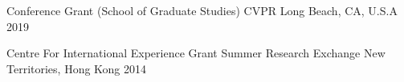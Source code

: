 



\begin{cvhonors}

  \cvhonor
    {Conference Grant (School of Graduate Studies)} %
    {CVPR} %
    {Long Beach, CA, U.S.A} %
    {2019} %

  \cvhonor
    {Centre For International Experience Grant} %
    {Summer Research Exchange} %
    {New Territories, Hong Kong} %
    {2014} %
		
\end{cvhonors}




